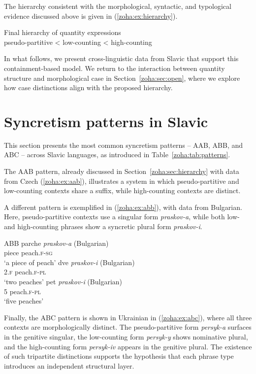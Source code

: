 \documentclass[output=paper,colorlinks,citecolor=brown
]{langscibook}
\begin{document}
The hierarchy consistent with the morphological, syntactic, and typological evidence discussed above is given in (\ref{zoha:ex:hierarchy}).

\ea Final hierarchy of quantity expressions \label{zoha:ex:hierarchy} \\ pseudo-partitive < low-counting < high-counting \z

\noindent In what follows, we present cross-linguistic data from Slavic that support this containment-based model. We return to the interaction between quantity structure and morphological case in Section~\ref{zoha:sec:open}, where we explore how case distinctions align with the proposed hierarchy.

\section{Syncretism patterns in Slavic}\label{zoha:sec:Slavicpatterns}

This section presents the most common syncretism patterns -- AAB, ABB, and ABC -- across Slavic languages, as introduced in Table~\ref{zoha:tab:patterns}.

The AAB pattern, already discussed in Section~\ref{zoha:sec:hierarchy} with data from Czech (\ref{zoha:ex:aab}), illustrates a system in which pseudo-partitive and low-counting contexts share a suffix, while high-counting contexts are distinct.

A different pattern is exemplified in (\ref{zoha:ex:abb}), with data from Bulgarian. Here, pseudo-partitive contexts use a singular form \textit{praskov-a}, while both low- and high-counting phrases show a syncretic plural form \textit{praskov-i}.

\ea ABB \label{zoha:ex:abb}
    \ea \gll parche \textit{praskov-a} (Bulgarian)\\
    piece peach.\textsc{f}-\textsc{sg}\\
    \glt `a piece of peach' \label{zoha:ex:abbpart}
    \ex \gll dve \textit{praskov-i} (Bulgarian)\\
    2.\textsc{f} peach.\textsc{f}-\textsc{pl}\\
    \glt `two peaches'\label{zoha:ex:abblow}
    \ex \gll pet \textit{praskov-i} (Bulgarian)\\
    5 peach.\textsc{f}-\textsc{pl}\\
    \glt `five peaches'\label{zoha:ex:abbhigh}
    \z
\z

\noindent Finally, the ABC pattern is shown in Ukrainian in (\ref{zoha:ex:abc}), where all three contexts are morphologically distinct. The pseudo-partitive form \textit{persyk-a} surfaces in the genitive singular, the low-counting form \textit{persyk-y} shows nominative plural, and the high-counting form \textit{persyk-iv} appears in the genitive plural. The existence of such tripartite distinctions supports the hypothesis that each phrase type introduces an independent structural layer.
\end{document}
